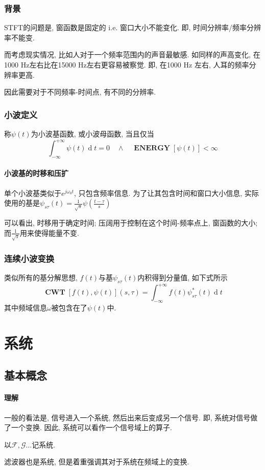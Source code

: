 \documentclass{ctexart}
\DeclareMathOperator{\CWT}{\mathbf{CWT}}
\DeclareMathOperator{\ENERGY}{\mathbf{ENERGY}}
\DeclareMathOperator{\ud}{\mathrm{d}}
\begin{document}
\subsubsection{背景}
    STFT的问题是, 窗函数是固定的 i.e. 窗口大小不能变化.
    即, 时间分辨率/频率分辨率不能变.\par
    而考虑现实情况, 比如人对于一个频率范围内的声音最敏感.
    如同样的声高变化, 在1000 Hz左右比在15000 Hz左右更容易被察觉.
    即, 在1000 Hz 左右, 人耳的频率分辨率更高.\par
    因此需要对于不同频率-时间点, 有不同的分辨率.
\subsubsection{小波定义}
    称$\psi(t)$为小波基函数, 或小波母函数, 当且仅当
    \[ \int_{-\infty}^{+\infty} \psi(t) \ud t = 0 
        \quad\land\quad
        \ENERGY[\psi(t)] < \infty \]
\paragraph{小波基的时移和压扩}
    单个小波基类似于$e^{j\omega_0 t}$, 只包含频率信息.
    为了让其包含时间和窗口大小信息, 实际使用的基是$
        \psi_{s\tau}(t) = \frac{1}{\sqrt{s}} \psi\left(\frac{t-\tau}{s}\right) $\par
    可以看出, 时移用于确定时间; 压阔用于控制在这个时间-频率点上, 窗函数的大小;
    而$\frac{1}{\sqrt{s}}$用来使得能量不变.
\subsubsection{连续小波变换}
    类似所有的基分解思想, $f(t)$与基$\psi_{s\tau}(t)$内积得到分量值, 如下式所示
    \[
        \CWT[f(t), \psi(t)](s, \tau) = \int_{-\infty}^{+\infty} f(t) \psi^*_{s\tau}(t) \ud t
    \]
    其中频域信息$\omega$被包含在了$\psi(t)$中.

\section{系统}
\subsection{基本概念}
\paragraph{理解}
    一般的看法是, 信号进入一个系统, 然后出来后变成另一个信号. 即, 系统对信号做了一个变换.
    因此, 系统可以看作一个信号域上的算子.\par
    以$\mathcal{F}, \mathcal{G}\ldots$记系统.\par
    滤波器也是系统, 但是着重强调其对于系统在频域上的变换.
\end{document}
